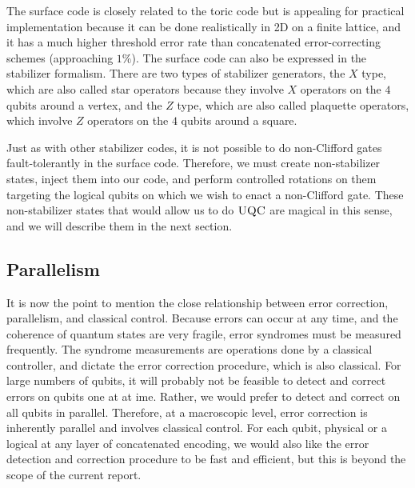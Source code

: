 
The surface code is closely related to the toric code but is appealing for
practical implementation because it can be done realistically
in 2D on a finite lattice, and it has a much higher threshold error rate
than concatenated error-correcting schemes (approaching $1\%$).
The surface code can also be expressed in the stabilizer formalism. There
are two types of stabilizer generators, the $X$ type, which are also called
star operators because they involve $X$ operators on the $4$ qubits around a 
vertex, and the $Z$ type, which are also called plaquette operators, which
involve $Z$ operators on the $4$ qubits around a square.

Just as with other stabilizer codes, it is not possible to do non-Clifford
gates fault-tolerantly in the surface code. Therefore, we must create
non-stabilizer states, inject them into our code, and perform controlled
rotations on them targeting the logical qubits on which we wish to enact
a non-Clifford gate. These non-stabilizer states that would allow us to
do $\textsc{UQC}$ are magical in this sense, and we will describe them in the next
section.


\subsection{Parallelism}

It is now the point to mention the close relationship between error correction,
parallelism, and classical control. Because errors can occur at any time,
and the coherence of quantum states are very fragile, error syndromes must be
measured frequently. The syndrome measurements are operations done by a
classical controller, and dictate the error correction procedure, which is
also classical. For large numbers of qubits, it will probably not be
feasible to detect and correct errors on qubits one at at ime. Rather, we would
prefer to detect and correct on all qubits in parallel. Therefore, at a
macroscopic level, error correction is inherently parallel and involves
classical control. For each qubit, physical or a logical at any
layer of concatenated encoding, we would also like the error detection
and correction procedure to be fast and efficient, but this is beyond the
scope of the current report.